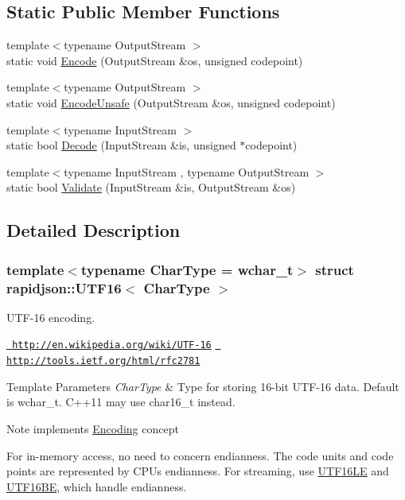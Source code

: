 \subsection*{Static Public Member Functions}
\begin{DoxyCompactItemize}
\item 
{\footnotesize template$<$typename Output\+Stream $>$ }\\static void \mbox{\hyperlink{structrapidjson_1_1_u_t_f16_a7f15344b8f35e341a723fa25d22e59d2}{Encode}} (Output\+Stream \&os, unsigned codepoint)
\item 
{\footnotesize template$<$typename Output\+Stream $>$ }\\static void \mbox{\hyperlink{structrapidjson_1_1_u_t_f16_aac8a8cdff51c647b3c3a9d7df5c2ce62}{Encode\+Unsafe}} (Output\+Stream \&os, unsigned codepoint)
\item 
{\footnotesize template$<$typename Input\+Stream $>$ }\\static bool \mbox{\hyperlink{structrapidjson_1_1_u_t_f16_a2665394536a32c9ea76d0cc7184e52fe}{Decode}} (Input\+Stream \&is, unsigned $\ast$codepoint)
\item 
{\footnotesize template$<$typename Input\+Stream , typename Output\+Stream $>$ }\\static bool \mbox{\hyperlink{structrapidjson_1_1_u_t_f16_a9bfa2e9096b1596e0b3a2cc2be6c9477}{Validate}} (Input\+Stream \&is, Output\+Stream \&os)
\end{DoxyCompactItemize}


\subsection{Detailed Description}
\subsubsection*{template$<$typename Char\+Type = wchar\+\_\+t$>$\newline
struct rapidjson\+::\+U\+T\+F16$<$ Char\+Type $>$}

U\+T\+F-\/16 encoding. 

\href{http://en.wikipedia.org/wiki/UTF-16}{\texttt{ http\+://en.\+wikipedia.\+org/wiki/\+U\+T\+F-\/16}} \href{http://tools.ietf.org/html/rfc2781}{\texttt{ http\+://tools.\+ietf.\+org/html/rfc2781}} 
\begin{DoxyTemplParams}{Template Parameters}
{\em Char\+Type} & Type for storing 16-\/bit U\+T\+F-\/16 data. Default is wchar\+\_\+t. C++11 may use char16\+\_\+t instead. \\
\hline
\end{DoxyTemplParams}
\begin{DoxyNote}{Note}
implements \mbox{\hyperlink{classrapidjson_1_1_encoding}{Encoding}} concept

For in-\/memory access, no need to concern endianness. The code units and code points are represented by C\+PU\textquotesingle{}s endianness. For streaming, use \mbox{\hyperlink{structrapidjson_1_1_u_t_f16_l_e}{U\+T\+F16\+LE}} and \mbox{\hyperlink{structrapidjson_1_1_u_t_f16_b_e}{U\+T\+F16\+BE}}, which handle endianness. 
\end{DoxyNote}



